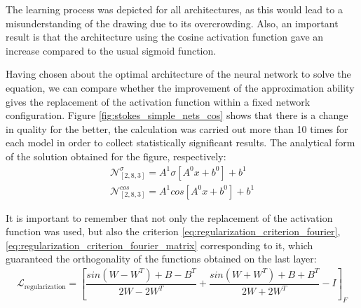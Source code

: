 The learning process was depicted for all architectures, as this would lead to a misunderstanding of the drawing due to its overcrowding. Also, an important result is that the architecture using the сosine activation function gave an increase compared to the usual sigmoid function. 

Having chosen about the optimal architecture of the neural network to solve the equation, we can compare whether the improvement of the approximation ability gives the replacement of the activation function within a fixed network configuration. Figure \ref{fig:stokes_simple_nets_cos} shows that there is a change in quality for the better, the calculation was carried out more than 10 times for each model in order to collect statistically significant results. The analytical form of the solution obtained for the figure, respectively:
\begin{equation*}
	\begin{matrix}
		\mathcal{N}_{[2, 8, 3]}^{\sigma} = A^1 \sigma \left [ A^0 x + b^0 \right ] + b^1 \\[10pt]
		\mathcal{N}_{[2, 8, 3]}^{cos} = A^1 cos \left [ A^0 x + b^0 \right ] + b^1
	\end{matrix}
\end{equation*}

It is important to remember that not only the replacement of the activation function was used, but also the criterion \eqref{eq:regularization_criterion_fourier}, \eqref{eq:regularization_criterion_fourier_matrix} corresponding to it, which guaranteed the orthogonality of the functions obtained on the last layer:
\begin{equation*}
	\begin{split}	
		\mathcal{L}_{\text{regularization}} = \left [ \dfrac{sin(W - W^T) + B - B^T}{2 W - 2 W^T} + \dfrac{sin(W + W^T) + B + B^T}{2 W + 2 W^T} - I \right ]_F
	\end{split}
\end{equation*}
